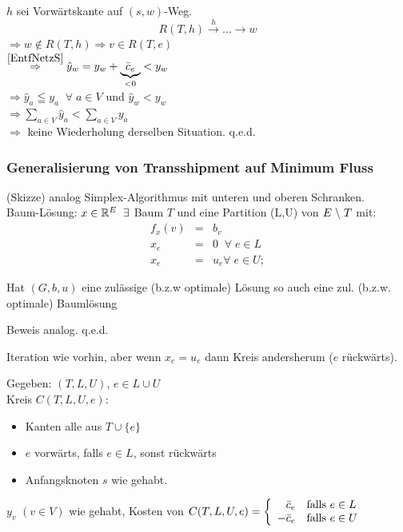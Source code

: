 $h$ sei Vorwärtskante auf $(s,w)$-Weg.
\[R(T,h)\stackrel{h}{\rightarrow}\ldots\rightarrow w\]
$\Rightarrow w \not\in R(T,h) \Rightarrow v \in R(T,e)$\\
$\stackrel{\ref{EntfNetzS}}{\Rightarrow} \hat{y}_{w} = y_{w}+
\underbrace{\bar{c}_{e}}_{< 0} < y_{w}$\\
$\Rightarrow \hat{y}_{a} \leqq y_{a} \; \; \forall\; a \in V$ und
$\hat{y}_{w} < y_{w}$\\
$\Rightarrow \displaystyle \sum_{a\in V} \hat{y}_{a} < \sum_{a \in V}
y_{a}$\\
$\Rightarrow$ keine Wiederholung derselben Situation. q.e.d.

\subsubsection{Generalisierung von Transshipment auf Minimum Fluss}
(Skizze) analog Simplex-Algorithmus mit unteren und oberen Schranken.\\
Baum-Lösung: $x\in \mathbb{R}^{E} \; \; \exists$ Baum $T$ und eine Partition (L,U)
von $E \;\backslash\; T$ mit:
\[\begin{array}{lcl}
f_{x}(v)&=& b_{v}\\
x_{e}&=&0 \; \; \forall \; e \in L\\
x_{e} &=& u_{e} \forall \; e \in U;  
\end{array}\]
\begin{satz}
Hat $(G,b,u)$ eine zulässige (b.z.w optimale) Lösung so auch eine zul.
(b.z.w. optimale) Baumlösung
\end{satz}

Beweis analog. q.e.d.

Iteration wie vorhin, aber wenn $x_{e} = u_{e}$ dann Kreis andersherum ($e$
rückwärts).

Gegeben: $(T,L,U)$, $e \in L \cup U$\\
Kreis $C(T,L,U,e)$:\\
\begin{itemize}
\item Kanten alle aus $T\cup\{e\}$
\item $e$ vorwärts, falls $e \in L$, sonst rückwärts
\item Anfangsknoten $s$ wie gehabt.
\end{itemize} 
$y_{v}$ $(v\in V)$ wie gehabt, Kosten von $C(T,L,U,e) = \left\{\begin{array}{rl}
\bar{c}_{e}&\mbox{falls }e \in L\\-\bar{c}_{e}&\mbox{falls }e \in U \end{array}\right. $

